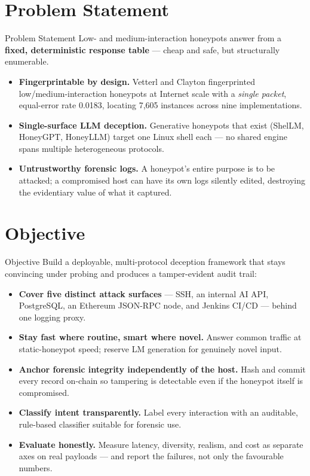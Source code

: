 \documentclass[aspectratio=169, 11pt]{beamer}
\begin{document}
\section{Problem Statement}
\begin{frame}{Problem Statement}
    Low- and medium-interaction honeypots answer from a \textbf{fixed, deterministic response table} --- cheap and safe, but structurally enumerable.
    \begin{itemize}
        \item \textbf{Fingerprintable by design.} Vetterl and Clayton fingerprinted low/medium-interaction honeypots at Internet scale with a \emph{single packet}, equal-error rate 0.0183, locating 7{,}605 instances across nine implementations.
        \vspace{2mm}
        \item \textbf{Single-surface LLM deception.} Generative honeypots that exist (ShelLM, HoneyGPT, HoneyLLM) target one Linux shell each --- no shared engine spans multiple heterogeneous protocols.
        \vspace{2mm}
        \item \textbf{Untrustworthy forensic logs.} A honeypot's entire purpose is to be attacked; a compromised host can have its own logs silently edited, destroying the evidentiary value of what it captured.
    \end{itemize}
\end{frame}

\section{Objective}
\begin{frame}{Objective}
    Build a deployable, multi-protocol deception framework that stays convincing under probing and produces a tamper-evident audit trail:
    \begin{itemize}
        \item \textbf{Cover five distinct attack surfaces} --- SSH, an internal AI API, PostgreSQL, an Ethereum JSON-RPC node, and Jenkins CI/CD --- behind one logging proxy.
        \item \textbf{Stay fast where routine, smart where novel.} Answer common traffic at static-honeypot speed; reserve LM generation for genuinely novel input.
        \item \textbf{Anchor forensic integrity independently of the host.} Hash and commit every record on-chain so tampering is detectable even if the honeypot itself is compromised.
        \item \textbf{Classify intent transparently.} Label every interaction with an auditable, rule-based classifier suitable for forensic use.
        \item \textbf{Evaluate honestly.} Measure latency, diversity, realism, and cost as separate axes on real payloads --- and report the failures, not only the favourable numbers.
    \end{itemize}
\end{frame}
\end{document}
